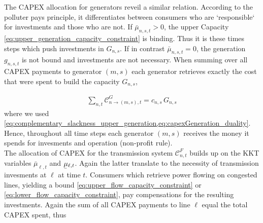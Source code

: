 \documentclass[11pt]{article}
\newcommand{\ubar}[1]{\underaccent{\bar}{#1}}
\newcommand{\generation}[1][n]{g_{#1,s,t}}
\newcommand{\capacityGeneration}{G_{n,s}}
\newcommand{\capexGeneration}{c_{n,s}}
\newcommand{\opexGeneration}[1][n]{o_{#1,s}}
\newcommand{\mulowergeneration}[1][n]{\ubar{\mu}_{#1,s,t}}
\newcommand{\muuppergeneration}[1][n]{\bar{\mu}_{#1,s,t}}
\newcommand{\mulowerflow}{\ubar{\mu}_{\ell,t}}
\newcommand{\muupperflow}{\bar{\mu}_{\ell,t}}
\newcommand{\lmp}[1][n]{\lambda_{#1,t}}
\newcommand{\allocateCapexGeneration}[1][n]{\mathcal{C}^{G}_{#1,t}}
\newcommand{\allocateCapexFlow}[1][n]{\mathcal{C}^{F}_{#1,t}}
\newcommand{\Forall}[1]{\hspace{20pt} \forall \,\, #1 }
\begin{document}
The CAPEX allocation for generators reveil a similar relation. According to the polluter pays principle, it differentiates between consumers who are `responsible` for investments and those who are not. If $\muuppergeneration > 0$, the upper Capacity \cref{eq:upper_generation_capacity_constraint} is binding. Thus it is these times steps which push investments in $\capacityGeneration$. If in contrast $\muuppergeneration = 0$, the generation $\generation$ is not bound and investments are not necessary. 
When summing over all CAPEX payments to generator $(m,s)$ each generator retrieves exactly the cost that were spent to build the capacity $\capacityGeneration$,

\begin{align}
 \sum_{n,t} \allocateCapexGeneration[n \rightarrow (m,s)] = \capexGeneration \, \capacityGeneration
\label{eq:no_profit_capex_generation}
\end{align}
where we used \cref{eq:complementary_slackness_upper_generation,eq:capexGeneration_duality}. Hence, throughout all time steps each generator $(m,s)$ receives the money it spends for invesments and operation (non-profit rule). 
\\ 

The allocation of CAPEX for the transmission system $\allocateCapexFlow$ builds up on the KKT variables $\muupperflow$ and $\mulowerflow$. Again the latter translate to the necessity of transmission invesments at $\ell$ at time $t$. Consumers which retrieve power flowing on congested lines, yielding a bound \cref{eq:upper_flow_capacity_constraint} or \eqref{eq:lower_flow_capacity_constraint}, pay compensations for the resulting investments. Again the sum of all CAPEX payments to line $\ell$ equal the total CAPEX spent, thus
\end{document}
